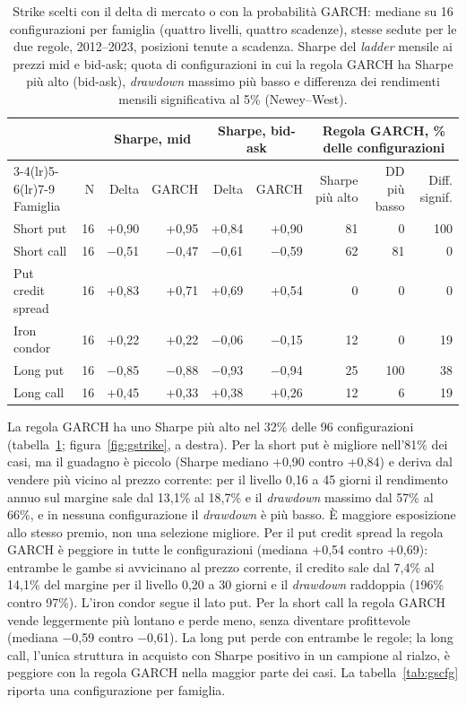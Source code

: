 \documentclass[11pt,a4paper]{article}
\begin{document}
\begin{table}[ht]\centering\footnotesize
\caption{Strike scelti con il delta di mercato o con la probabilità GARCH: mediane su 16 configurazioni per famiglia (quattro livelli, quattro scadenze), stesse sedute per le due regole, 2012--2023, posizioni tenute a scadenza. Sharpe del \emph{ladder} mensile ai prezzi mid e bid-ask; quota di configurazioni in cui la regola GARCH ha Sharpe più alto (bid-ask), \emph{drawdown} massimo più basso e differenza dei rendimenti mensili significativa al 5\% (Newey--West).}\label{tab:gsfam}
\begin{tabular}{lrrrrrrrr}\toprule
 & & \multicolumn{2}{c}{Sharpe, mid} & \multicolumn{2}{c}{Sharpe, bid-ask} & \multicolumn{3}{c}{Regola GARCH, \% delle configurazioni} \\ \cmidrule(lr){3-4}\cmidrule(lr){5-6}\cmidrule(lr){7-9}
Famiglia & N & Delta & GARCH & Delta & GARCH & Sharpe più alto & DD più basso & Diff. signif. \\ \midrule
Short put & 16 & +0{,}90 & +0{,}95 & +0{,}84 & +0{,}90 & 81 & 0 & 100 \\
Short call & 16 & $-$0{,}51 & $-$0{,}47 & $-$0{,}61 & $-$0{,}59 & 62 & 81 & 0 \\
Put credit spread & 16 & +0{,}83 & +0{,}71 & +0{,}69 & +0{,}54 & 0 & 0 & 0 \\
Iron condor & 16 & +0{,}22 & +0{,}22 & $-$0{,}06 & $-$0{,}15 & 12 & 0 & 19 \\
Long put & 16 & $-$0{,}85 & $-$0{,}88 & $-$0{,}93 & $-$0{,}94 & 25 & 100 & 38 \\
Long call & 16 & +0{,}45 & +0{,}33 & +0{,}38 & +0{,}26 & 12 & 6 & 19 \\
\bottomrule\end{tabular}\end{table}

La regola GARCH ha uno Sharpe più alto nel 32\% delle 96 configurazioni (tabella~\ref{tab:gsfam}; figura~\ref{fig:gstrike}, a destra). Per la short put è migliore nell'81\% dei casi, ma il guadagno è piccolo (Sharpe mediano +0{,}90 contro +0{,}84) e deriva dal vendere più vicino al prezzo corrente: per il livello 0{,}16 a 45 giorni il rendimento annuo sul margine sale dal 13{,}1\% al 18{,}7\% e il \emph{drawdown} massimo dal 57\% al 66\%, e in nessuna configurazione il \emph{drawdown} è più basso. È maggiore esposizione allo stesso premio, non una selezione migliore. Per il put credit spread la regola GARCH è peggiore in tutte le configurazioni (mediana +0{,}54 contro +0{,}69): entrambe le gambe si avvicinano al prezzo corrente, il credito sale dal 7{,}4\% al 14{,}1\% del margine per il livello 0{,}20 a 30 giorni e il \emph{drawdown} raddoppia (196\% contro 97\%). L'iron condor segue il lato put. Per la short call la regola GARCH vende leggermente più lontano e perde meno, senza diventare profittevole (mediana $-$0{,}59 contro $-$0{,}61). La long put perde con entrambe le regole; la long call, l'unica struttura in acquisto con Sharpe positivo in un campione al rialzo, è peggiore con la regola GARCH nella maggior parte dei casi. La tabella~\ref{tab:gscfg} riporta una configurazione per famiglia.
\end{document}
